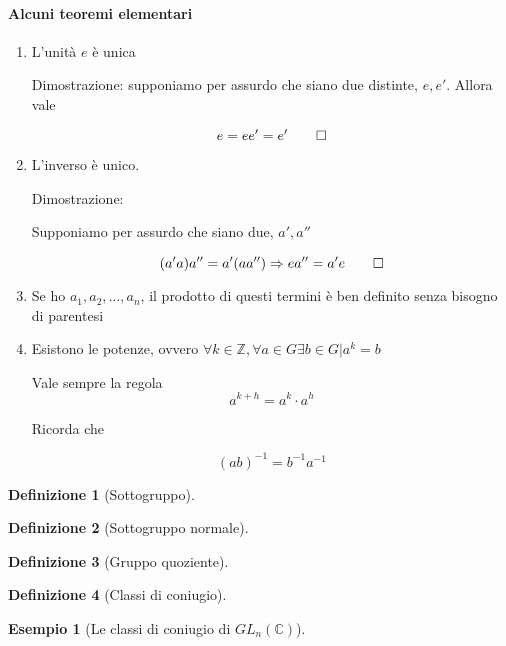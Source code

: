\documentclass[11pt]{article}
\theoremstyle{plain}
\theoremstyle{definition}
\newtheorem{defn}{Definizione}[section]
\newtheorem{exmp}{Esempio}[section]
\theoremstyle{remark}
\newcommand{\C}{\mathbb{C}}
\begin{document}
\paragraph{Alcuni teoremi elementari}
\begin{enumerate}
	\item L'unità $e$ è unica
	
	Dimostrazione: supponiamo per assurdo che siano due distinte, $e, e'$. Allora vale
	
	\[e = ee' = e' \qed\]
	
	\item L'inverso è unico.

	Dimostrazione:
	
	Supponiamo per assurdo che siano due, $a', a''$
	
	\[(a' a)a'' = a'(aa'') \Rightarrow e a'' = a' e \qed \]
	
	\item Se ho $a_1, a_2, \ldots, a_n$, il prodotto di questi termini è ben definito senza bisogno di parentesi
	\item Esistono le potenze, ovvero $\forall k \in \mathbb{Z}, \forall a \in G \exists b\in G | a^k = b$
	
	Vale sempre la regola
	\[a^{k+h} = a^k \cdot a^h \]
	
	Ricorda che 
	
	\[ (ab)^{-1} = b^{-1}a^{-1}\]

\end{enumerate}



\begin{defn}[Sottogruppo]

\end{defn}

\begin{defn}[Sottogruppo normale]

\end{defn}

\begin{defn}[Gruppo quoziente]

\end{defn}

\begin{defn}[Classi di coniugio]


\end{defn}


\begin{exmp}[Le classi di coniugio di $GL_n(\C)$]

\end{exmp}
\end{document}
